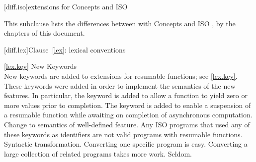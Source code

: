
[diff.iso]{\Cpp extensions for Concepts and ISO }

\pnum
This subclause lists the differences between \Cpp with Concepts
and ISO \Cpp, by the chapters of this document.

[diff.lex]{Clause~\ref{lex}: lexical conventions}

\ref{lex.key}
\change New Keywords\\
New keywords are added to \Cpp extensions for resumable functions;
see \ref{lex.key}.
\rationale
These keywords were added in order to implement the semantics of the
new features. In particular, the  keyword is added
to allow a function to yield zero or more values prior to completion. The  keyword is
added to enable a suspension of a resumable function while
awaiting on completion of asynchronous computation.
\effect
Change to semantics of well-defined feature.
Any ISO \Cpp programs that used any of these keywords as identifiers
are not valid \Cpp programs with resumable functions.
\difficulty
Syntactic transformation.
Converting one specific program is easy.
Converting a large collection
of related programs takes more work.
\howwide
Seldom.

